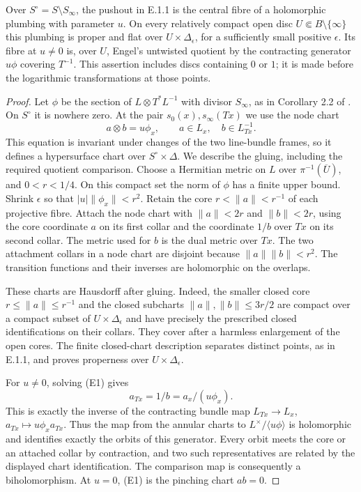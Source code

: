 \begin{proposition}\label{fam:src:E.1.2}\label{fam:st:E.1.2}
Over $S^\circ=S\setminus S_\infty$, the pushout in E.1.1 is the central
fibre of a holomorphic plumbing with parameter $u$. On every relatively
compact open disc $U\Subset B\setminus\{\infty\}$ this plumbing is
proper and flat over $U\times\Delta_\epsilon$, for a sufficiently small
positive $\epsilon$. Its fibre at $u\ne0$ is, over $U$, Engel's untwisted
quotient by the contracting generator $u\phi$ covering $T^{-1}$.
This assertion includes discs containing $0$ or $1$; it is made before
the logarithmic transformations at those points.
\end{proposition}

\begin{proof}
Let $\phi$ be the section of $L\otimes T^*L^{-1}$ with divisor
$S_\infty$, as in Corollary 2.2 of \cite{E26}. On $S^\circ$ it is
nowhere zero. At the pair $s_0(x),s_\infty(Tx)$ we use the node chart
\[
       a\otimes b=u\phi_x,
       \qquad a\in L_x,\quad b\in L^{-1}_{Tx}.                 \tag{E1}
\]
This equation is invariant under changes of the two line-bundle
frames, so it defines a hypersurface chart over $S^\circ\times\Delta$.
We describe the gluing, including the required quotient comparison.
Choose a Hermitian metric on $L$ over $\pi^{-1}(\overline U)$, and
$0<r<1/4$. On this compact set the norm of $\phi$ has a finite upper
bound. Shrink $\epsilon$ so that $|u|\|\phi_x\|<r^2$.
Retain the core $r<\|a\|<r^{-1}$ of each projective fibre. Attach the
node chart with $\|a\|<2r$ and $\|b\|<2r$, using the core coordinate
$a$ on its first collar and the coordinate $1/b$ over $Tx$ on its
second collar. The metric used for $b$ is the dual metric over $Tx$.
The two attachment collars in a node chart are disjoint because
$\|a\|\|b\|<r^2$. The transition functions and their inverses are
holomorphic on the overlaps.

These charts are Hausdorff after gluing. Indeed, the smaller closed
core $r\leq\|a\|\leq r^{-1}$ and the closed subcharts
$\|a\|,\|b\|\leq 3r/2$ are compact over a compact subset of
$U\times\Delta_\epsilon$ and have precisely the prescribed closed
identifications on their collars. They cover after a harmless
enlargement of the open cores. The finite closed-chart description
separates distinct points, as in E.1.1, and proves properness over
$U\times\Delta_\epsilon$.

For $u\ne0$, solving (E1) gives
\[
              a_{Tx}=1/b=a_x/(u\phi_x).
\]
This is exactly the inverse of the contracting bundle map
$L_{Tx}\to L_x$, $a_{Tx}\mapsto u\phi_xa_{Tx}$. Thus the map from
the annular charts to $L^\times/\langle u\phi\rangle$ is holomorphic
and identifies exactly the orbits of this generator. Every orbit
meets the core or an attached collar by contraction, and two such
representatives are related by the displayed chart identification.
The comparison map is consequently a biholomorphism. At $u=0$,
(E1) is the pinching chart $ab=0$.


\end{proof}
